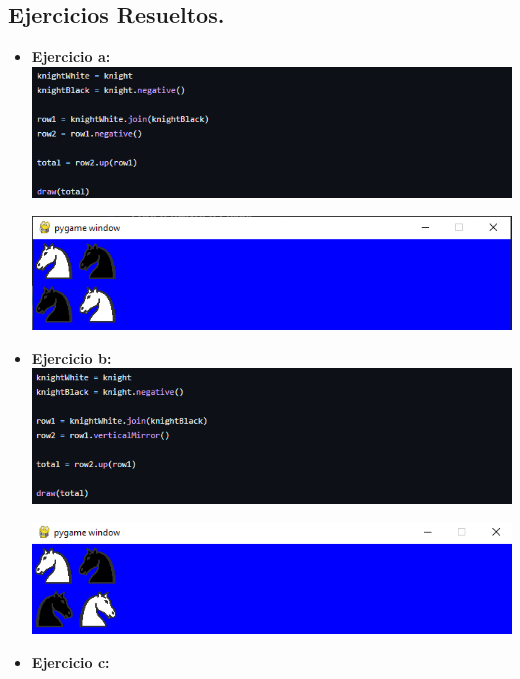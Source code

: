 \documentclass{article}
\begin{document}
\subsection*{Ejercicios Resueltos.}

\begin{itemize}
\item \textbf{Ejercicio a:} \\



\includegraphics[width=\textwidth]{img/9.png}


\includegraphics[width=\textwidth]{img/10.png}
\item \textbf{Ejercicio b:} \\



\includegraphics[width=\textwidth]{img/11.png}


\includegraphics[width=\textwidth]{img/12.png}
\item \textbf{Ejercicio c:} \\




\end{itemize}
\end{document}
